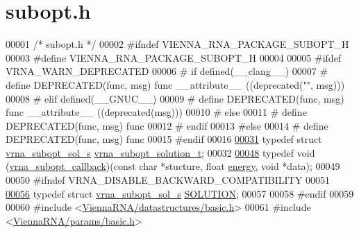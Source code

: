 \hypertarget{subopt_8h_source}{}\section{subopt.\+h}
\label{subopt_8h_source}

\begin{DoxyCode}
00001 \textcolor{comment}{/* subopt.h */}
00002 \textcolor{preprocessor}{#ifndef VIENNA\_RNA\_PACKAGE\_SUBOPT\_H}
00003 \textcolor{preprocessor}{#define VIENNA\_RNA\_PACKAGE\_SUBOPT\_H}
00004 
00005 \textcolor{preprocessor}{#ifdef VRNA\_WARN\_DEPRECATED}
00006 \textcolor{preprocessor}{# if defined(\_\_clang\_\_)}
00007 \textcolor{preprocessor}{#  define DEPRECATED(func, msg) func \_\_attribute\_\_ ((deprecated("", msg)))}
00008 \textcolor{preprocessor}{# elif defined(\_\_GNUC\_\_)}
00009 \textcolor{preprocessor}{#  define DEPRECATED(func, msg) func \_\_attribute\_\_ ((deprecated(msg)))}
00010 \textcolor{preprocessor}{# else}
00011 \textcolor{preprocessor}{#  define DEPRECATED(func, msg) func}
00012 \textcolor{preprocessor}{# endif}
00013 \textcolor{preprocessor}{#else}
00014 \textcolor{preprocessor}{# define DEPRECATED(func, msg) func}
00015 \textcolor{preprocessor}{#endif}
00016 
\hyperlink{subopt_8h_a01ae9a0f27d245d89f705afd843fc457}{00031} \textcolor{keyword}{typedef} \textcolor{keyword}{struct }\hyperlink{structvrna__subopt__sol__s}{vrna\_subopt\_sol\_s}   \hyperlink{structvrna__subopt__sol__s}{vrna\_subopt\_solution\_t};
00032 
\hyperlink{group__subopt__wuchty_gaa0270c66d04f59e750401695b8282e04}{00048} \textcolor{keyword}{typedef} void (\hyperlink{group__subopt__wuchty_gaa0270c66d04f59e750401695b8282e04}{vrna\_subopt\_callback})(\textcolor{keyword}{const} \textcolor{keywordtype}{char} *stucture, \textcolor{keywordtype}{float} 
      \hyperlink{structvrna__subopt__sol__s_a99bc26ca68392aa4656386cf73b73fef}{energy}, \textcolor{keywordtype}{void} *data);
00049 
00050 \textcolor{preprocessor}{#ifndef VRNA\_DISABLE\_BACKWARD\_COMPATIBILITY}
00051 
\hyperlink{subopt_8h_aa0f46ff02e1017469cf902d02ecd7f9a}{00056} \textcolor{keyword}{typedef} \textcolor{keyword}{struct }\hyperlink{structvrna__subopt__sol__s}{vrna\_subopt\_sol\_s}   \hyperlink{structvrna__subopt__sol__s}{SOLUTION};
00057 
00058 \textcolor{preprocessor}{#endif}
00059 
00060 \textcolor{preprocessor}{#include <\hyperlink{datastructures_2basic_8h}{ViennaRNA/datastructures/basic.h}>}
00061 \textcolor{preprocessor}{#include <\hyperlink{params_2basic_8h}{ViennaRNA/params/basic.h}>}

\end{DoxyCode}
